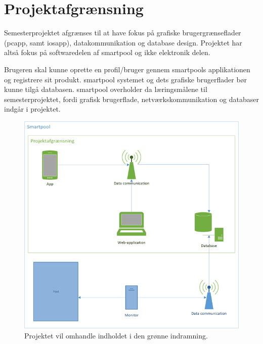 \section{Projektafgrænsning}
Semesterprojektet afgrænses til at have fokus på grafiske brugergrænseflader (\gls{pcapp}, samt \gls{iosapp}), datakommunikation og database design. Projektet har altså fokus på softwaredelen af \gls{smartpool} og ikke elektronik delen.

Brugeren skal kunne oprette en profil/bruger gennem \glspl{smartpool} applikationen og registrere sit produkt. \gls{smartpool} systemet og dets grafiske brugerflader bør kunne tilgå databasen. \gls{smartpool} overholder da læringsmålene til semesterprojektet, fordi grafisk brugerflade, netværkskommunikation og databaser indgår i projektet.

\begin{figure}
	\centering
	\includegraphics[width=\linewidth]{figs/afgraensning.png}
	\caption{Projektet vil omhandle indholdet i den grønne indramning.}
	\label{fig:afgraensning}
\end{figure}
